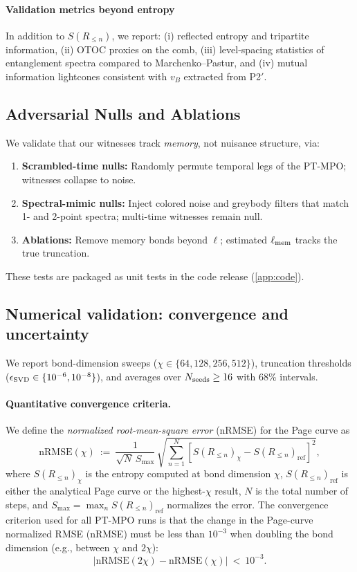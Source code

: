 \documentclass[a4paper,11pt]{article}
\newcommand{\eg}{e.g.\xspace}
\theoremstyle{plain}
\theoremstyle{definition}
\theoremstyle{remark}
\begin{document}
\paragraph{Validation metrics beyond entropy}
In addition to $S(R_{\le n})$, we report: (i) reflected entropy and tripartite information, (ii) OTOC proxies on the comb, (iii) level-spacing statistics of entanglement spectra compared to Marchenko--Pastur, and (iv) mutual information lightcones consistent with $v_B$ extracted from P2$'$.

\subsection{Adversarial Nulls and Ablations}
\label{subsec:adversarial}
We validate that our witnesses track \emph{memory}, not nuisance structure, via:
\begin{enumerate}[leftmargin=*,label=(\roman*)]
\item \textbf{Scrambled-time nulls:} Randomly permute temporal legs of the PT-MPO; witnesses collapse to noise.
\item \textbf{Spectral-mimic nulls:} Inject colored noise and greybody filters that match 1- and 2-point spectra; multi-time witnesses remain null.
\item \textbf{Ablations:} Remove memory bonds beyond $\ell$; estimated $\ell_{\rm mem}$ tracks the true truncation.
\end{enumerate}
These tests are packaged as unit tests in the code release (\cref{app:code}).

\subsection*{Numerical validation: convergence and uncertainty}
We report bond-dimension sweeps ($\chi\in\{64,128,256,512\}$), truncation thresholds
($\epsilon_{\rm SVD}\in\{10^{-6},10^{-8}\}$), and averages over $N_{\rm seeds}\ge 16$ with 68\% intervals.

\paragraph{Quantitative convergence criteria.}
We define the \emph{normalized root-mean-square error} (nRMSE) for the Page curve as
\begin{equation}
\mathrm{nRMSE}(\chi) \ :=\ \frac{1}{\sqrt{N}\,S_{\max}}\,\sqrt{\sum_{n=1}^N\left[S(R_{\le n})_{\chi} - S(R_{\le n})_{\mathrm{ref}}\right]^2},
\end{equation}
where $S(R_{\le n})_{\chi}$ is the entropy computed at bond dimension $\chi$, $S(R_{\le n})_{\mathrm{ref}}$ is either the analytical Page curve or the highest-$\chi$ result, $N$ is the total number of steps, and $S_{\max}=\max_n S(R_{\le n})_{\mathrm{ref}}$ normalizes the error. The convergence criterion used for all PT-MPO runs is that the change in the Page-curve normalized RMSE (nRMSE) must be less than $10^{-3}$ when doubling the bond dimension (\eg, between $\chi$ and $2\chi$):
\begin{equation}
\left|\mathrm{nRMSE}(2\chi) - \mathrm{nRMSE}(\chi)\right| \ <\ 10^{-3}.
\end{equation}
\end{document}
